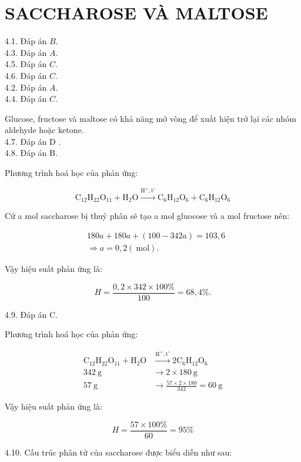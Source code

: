 \documentclass[10pt]{article}
\begin{document}
\section*{SACCHAROSE VÀ MALTOSE}
4.1. Đáp án $B$.\\
4.3. Đáp án $A$.\\
4.5. Đáp án $C$.\\
4.6. Đáp án $C$.\\
4.2. Đáp án $A$.\\
4.4. Đáp án $C$.

Glucose, fructose và maltose có khả năng mở vòng để xuất hiện trở lại các nhóm aldehyde hoặc ketone.\\
4.7. Đáp án D .\\
4.8. Đáp án B.

Phương trình hoá học của phản ứng:

$$
\mathrm{C}_{12} \mathrm{H}_{22} \mathrm{O}_{11}+\mathrm{H}_{2} \mathrm{O} \xrightarrow{\mathrm{H}^{+}, \mathrm{t}^{\circ}} \mathrm{C}_{6} \mathrm{H}_{12} \mathrm{O}_{6}+\mathrm{C}_{6} \mathrm{H}_{12} \mathrm{O}_{6}
$$

Cứ a mol saccharose bị thuỷ phân sẽ tạo a mol gluocose và a mol fructose nên:

$$
\begin{aligned}
& 180 a+180 a+(100-342 a)=103,6 \\
& \Rightarrow a=0,2(\mathrm{~mol}) .
\end{aligned}
$$

Vậy hiệu suất phản ứng là:

$$
H=\frac{0,2 \times 342 \times 100 \%}{100}=68,4 \% .
$$

4.9. Đáp án C.

Phương trình hoá học của phản ứng:

$$
\begin{aligned}
\mathrm{C}_{12} \mathrm{H}_{22} \mathrm{O}_{11}+\mathrm{H}_{2} \mathrm{O} & \xrightarrow{\mathrm{H}^{+}, \mathrm{t}^{\circ}} 2 \mathrm{C}_{6} \mathrm{H}_{12} \mathrm{O}_{6} \\
342 \mathrm{~g} & \longrightarrow 2 \times 180 \mathrm{~g} \\
57 \mathrm{~g} & \longrightarrow \frac{57 \times 2 \times 180}{342}=60 \mathrm{~g}
\end{aligned}
$$

Vậy hiệu suất phản ứng là:

$$
H=\frac{57 \times 100 \%}{60}=95 \%
$$

4.10. Cấu trúc phân tử của saccharose được biểu diễn như sau:
\end{document}
